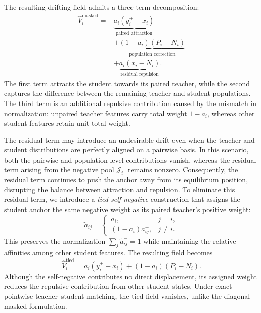 \documentclass{article}
\begin{document}
The resulting drifting field admits a three-term
decomposition:
\begin{equation}
\begin{aligned}
\widehat V_i^{\mathrm{masked}}
={}&
\underbrace{a_i(y_i^+-x_i)}_{\text{paired attraction}}\\
&+
\underbrace{(1-a_i)(P_i-N_i)}_{\text{population correction}}\\
&+
\underbrace{a_i(x_i-N_i)}_{\text{residual repulsion}}.
\end{aligned}
\label{eq:masked_decomposition}
\end{equation}
The first term attracts the student towards its
paired teacher, while the second captures the
difference between the remaining teacher and
student populations. The third term is an additional
repulsive contribution caused by the mismatch in
normalization: unpaired teacher features carry
total weight $1-a_i$, whereas other student features
retain unit total weight.


The residual term may introduce an undesirable drift even when the teacher and student distributions are perfectly aligned on a pairwise basis. In this scenario, both the pairwise and population-level contributions vanish, whereas the residual term arising from the negative pool $\mathcal J_i^-$ remains nonzero. Consequently, the residual term continues to push the anchor away from its equilibrium position, disrupting the balance between attraction and repulsion.
To eliminate this residual term, we introduce a
\emph{tied self-negative} construction that assigns
the student anchor the same negative weight as its
paired teacher's positive weight:
\begin{equation}
\widetilde a_{ij}^{-}=
\begin{cases}
a_i, & j=i,\\
(1-a_i)a_{ij}^{-}, & j\neq i.
\end{cases}
\label{eq:tied_negative}
\end{equation}
This preserves the normalization
$\sum_j\widetilde a_{ij}^{-}=1$
while maintaining the relative affinities among
other student features. The resulting field becomes
\begin{equation}
\boxed{
\widehat V_i^{\mathrm{tied}}
=
a_i(y_i^+-x_i)
+
(1-a_i)(P_i-N_i).
}
\label{eq:tied_drift}
\end{equation}
Although the self-negative contributes no direct
displacement, its assigned weight reduces the
repulsive contribution from other student states.
Under exact pointwise teacher--student matching,
the tied field vanishes, unlike the diagonal-masked
formulation.
\end{document}
